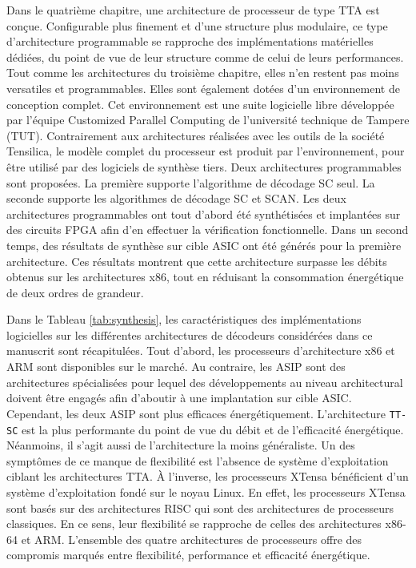 Dans le quatrième chapitre, une architecture de processeur de type TTA est conçue. Configurable plus finement et d'une structure plus modulaire, ce type d'architecture programmable se rapproche des implémentations matérielles dédiées, du point de vue de leur structure comme de celui de leurs performances. Tout comme les architectures du troisième chapitre, elles n'en restent pas moins versatiles et programmables. Elles sont également dotées d'un environnement de conception complet. Cet environnement est une suite logicielle libre développée par l'équipe \og Customized Parallel Computing \fg de l'université technique de Tampere (TUT). Contrairement aux architectures réalisées avec les outils de la société Tensilica, le modèle complet du processeur est produit par l'environnement, pour être utilisé par des logiciels de synthèse tiers. Deux architectures programmables sont proposées. La première supporte l'algorithme de décodage SC seul. La seconde supporte les algorithmes de décodage SC et SCAN. Les deux architectures programmables ont tout d'abord été synthétisées et implantées sur des circuits FPGA afin d'en effectuer la vérification fonctionnelle. Dans un second temps, des résultats de synthèse sur cible ASIC ont été générés pour la première architecture. Ces résultats montrent que cette architecture surpasse les débits obtenus sur les architectures x86, tout en réduisant la consommation énergétique de deux ordres de grandeur.

Dans le Tableau \ref{tab:synthesis}, les caractéristiques des implémentations logicielles sur les différentes architectures de décodeurs considérées dans ce manuscrit sont récapitulées. Tout d'abord, les processeurs d'architecture x86 et ARM sont disponibles sur le marché. Au contraire, les ASIP sont des architectures spécialisées pour lequel des développements au niveau architectural doivent être engagés afin d'aboutir à une implantation sur cible ASIC. Cependant, les deux ASIP sont plus efficaces énergétiquement. L'architecture \texttt{TT-SC} est la plus performante du point de vue du débit et de l'efficacité énergétique. Néanmoins, il s'agit aussi de l'architecture la moins généraliste. Un des symptômes de ce manque de flexibilité est l'absence de système d'exploitation ciblant les architectures TTA. \`A l'inverse, les processeurs XTensa bénéficient d'un système d'exploitation fondé sur le noyau Linux. En effet, les processeurs XTensa sont basés sur des architectures RISC qui sont des architectures de processeurs classiques. En ce sens, leur flexibilité se rapproche de celles des architectures x86-64 et ARM.
L'ensemble des quatre architectures de processeurs offre des compromis marqués entre flexibilité, performance et efficacité énergétique.

